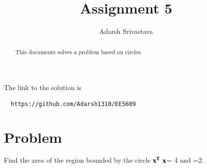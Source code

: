\documentclass[journal,12pt,twocolumn]{IEEEtran}
\begin{document}
      \def\rightbox#1{\makebox[0in][r]{#1}}
      \def\centbox#1{\makebox[0in]{#1}}
      \def\topbox#1{\raisebox{-\baselineskip}[0in][0in]{#1}}
      \def\midbox#1{\raisebox{-0.5\baselineskip}[0in][0in]{#1}}
 \vspace{3cm}
 \title{Assignment 5}
 \author{Adarsh Srivastava}
 \maketitle
 \newpage
 \bigskip
 \renewcommand{\thetable}{\theenumi}
 The link to the solution is
 \begin{lstlisting}
  https://github.com/Adarsh1310/EE5609
 \end{lstlisting}
 \begin{abstract}
 This documents solves a problem based on circles.
 \end{abstract}
  \section{\textbf{Problem}}
 Find the area of the region bounded by the circle $\bf{x}^{T}$ $\bf{x}$= 4 and =2.
\end{document}
